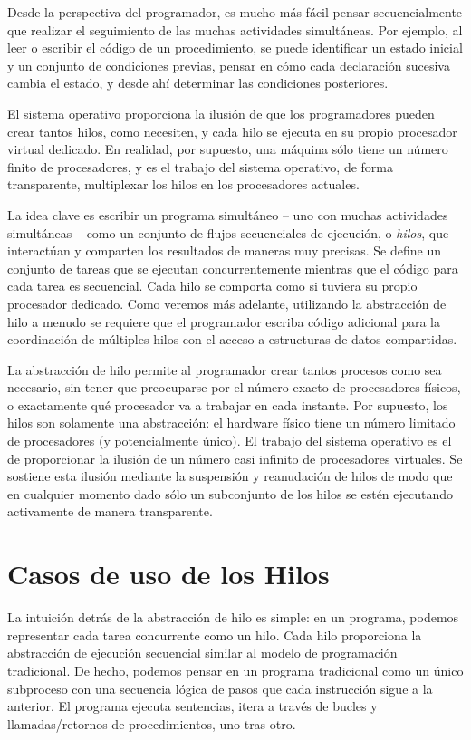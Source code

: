 \documentclass[10pt]{book}
\begin{document}
Desde la perspectiva del programador, es mucho más fácil pensar secuencialmente que realizar el seguimiento de las muchas actividades simultáneas. Por ejemplo, al leer o escribir el código de un procedimiento, se puede identificar un estado inicial y un conjunto de condiciones previas, pensar en cómo cada declaración sucesiva cambia el estado, y desde ahí determinar las condiciones posteriores.

El sistema operativo proporciona la ilusión de que los programadores pueden crear tantos hilos, como necesiten, y cada hilo se ejecuta en su propio procesador virtual dedicado. En realidad, por supuesto, una máquina sólo tiene un número finito de procesadores, y es el trabajo del sistema operativo, de forma transparente, multiplexar los hilos en los procesadores actuales.

La idea clave es escribir un programa simultáneo -- uno con muchas actividades simultáneas -- como un conjunto de flujos secuenciales de ejecución, o \textit{hilos}, que interactúan y comparten los resultados de maneras muy precisas. Se define un conjunto de tareas que se ejecutan concurrentemente mientras que el código para cada tarea es secuencial. Cada hilo se comporta como si tuviera su propio procesador dedicado. Como veremos más adelante, utilizando la abstracción de hilo a menudo se requiere que el programador escriba código adicional para la coordinación de múltiples hilos con el acceso a estructuras de datos compartidas.

La abstracción de hilo permite al programador crear tantos procesos como sea necesario, sin tener que preocuparse por el número exacto de procesadores físicos, o exactamente qué procesador va a trabajar en cada instante. Por supuesto, los hilos son solamente una abstracción: el hardware físico tiene un número limitado de procesadores (y potencialmente único). El trabajo del sistema operativo es el de proporcionar la ilusión de un número casi infinito de procesadores virtuales. Se sostiene esta ilusión mediante la suspensión y reanudación de hilos de modo que en cualquier momento dado sólo un subconjunto de los hilos se estén ejecutando activamente de manera transparente.

\section{Casos de uso de los Hilos}
La intuición detrás de la abstracción de hilo es simple: en un programa, podemos representar cada tarea concurrente como un hilo. Cada hilo proporciona la abstracción de ejecución secuencial similar al modelo de programación tradicional. De hecho, podemos pensar en un programa tradicional como un único subproceso con una secuencia lógica de pasos que cada instrucción sigue a la anterior. El programa ejecuta sentencias, itera a través de bucles y llamadas/retornos de procedimientos, uno tras otro.
\end{document}
